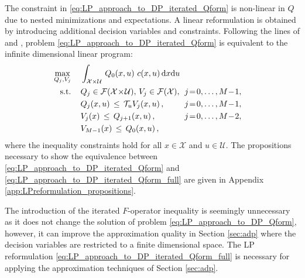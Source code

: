 \documentclass[journal]{IEEEtran}
\newcommand{\mcal}{\mathcal}
\newcommand{\subjto}{\text{s.t.}}
\newcommand{\intd}[1]{\mathrm{d}#1}
\newcommand{\xinX}{x\!\in\!\mathcal{X}}
\newcommand{\uinU}{u\!\in\!\mathcal{U}}
\newcommand{\funcSpaceX}{\smash{\mcal{F}(\mcal{X})}}
\newcommand{\funcSpaceXU}{\smash{\mcal{F}(\mcal{X} \!\times\! \mcal{U})}}
\begin{document}
The constraint in \eqref{eq:LP_approach_to_DP_iterated_Qform} is non-linear in $Q$ due to nested minimizations and expectations. A linear reformulation is obtained by introducing additional decision variables and constraints. Following the lines of \cite[Theorem 2]{vanroy_decentADP} and \cite[\S 3.4]{boyd_iteratedBellman}, problem \eqref{eq:LP_approach_to_DP_iterated_Qform} is equivalent to the infinite dimensional linear program:
\begin{equation} \label{eq:LP_approach_to_DP_iterated_Qform_full}
	\begin{aligned}
		\hspace{-0.20cm}
		\max_{Q_j,V_j}
			\,&\quad \int_{\mcal{X} \times \mcal{U}} \, Q_0(x,u) \,\, c(x,u) \, \intd{x} \intd{u}
		\\
		\hspace{-0.20cm}
		\subjto
			\,&\quad \smash{ Q_j \in \funcSpaceXU }
			,\,
			\smash{ V_j \in \funcSpaceX }
			,
			&& \hspace{-0.15cm} \smash{j \!=\! 0,\dots,M\!-\!1}
			,  \hspace{-0.20cm}
		\\
		\,&\quad Q_{j}(x,u) \,\leq\, \mcal{T}_u V_{j}(x,u)
			\,,
			&& \hspace{-0.15cm} \smash{j \!=\! 0,\dots,M\!-\!1}
			,  \hspace{-0.20cm}
		\\
		\,&\quad V_{j}(x) \,\leq\, Q_{j+1}(x,u)
			\,,
			&& \hspace{-0.15cm} \smash{j \!=\! 0,\dots,M\!-\!2}
			,  \hspace{-0.20cm}
		\\
		\,&\quad V_{M-1}(x) \,\leq\, Q_{0}(x,u)
			\,,
	\end{aligned}
	\end{equation}
where the inequality constraints hold for all $\xinX$ and $\uinU$.
The propositions necessary to show the equivalence between \eqref{eq:LP_approach_to_DP_iterated_Qform} and \eqref{eq:LP_approach_to_DP_iterated_Qform_full} are given in Appendix \ref{app:LPreformulation_propositions}.




The introduction of the iterated $F$-operator inequality is seemingly unnecessary as it does not change the solution of problem \eqref{eq:LP_approach_to_DP_Qform}, however, it can improve the approximation quality in Section \ref{sec:adp} where the decision variables are restricted to a finite dimensional space.
The LP reformulation \eqref{eq:LP_approach_to_DP_iterated_Qform_full} is necessary for applying the approximation techniques of Section \ref{sec:adp}.
\end{document}

